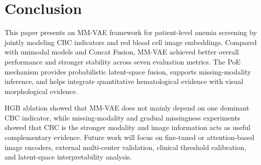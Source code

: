 \documentclass[conference,letterpaper]{IEEEtran}
\begin{document}
\FloatBarrier

\section{Conclusion}

This paper presents an MM-VAE framework for patient-level anemia screening by jointly modeling CBC indicators and red blood cell image embeddings. Compared with unimodal models and Concat Fusion, MM-VAE achieved better overall performance and stronger stability across seven evaluation metrics. The PoE mechanism provides probabilistic latent-space fusion, supports missing-modality inference, and helps integrate quantitative hematological evidence with visual morphological evidence.

HGB ablation showed that MM-VAE does not mainly depend on one dominant CBC indicator, while missing-modality and gradual missingness experiments showed that CBC is the stronger modality and image information acts as useful complementary evidence. Future work will focus on fine-tuned or attention-based image encoders, external multi-center validation, clinical threshold calibration, and latent-space interpretability analysis.
\end{document}
